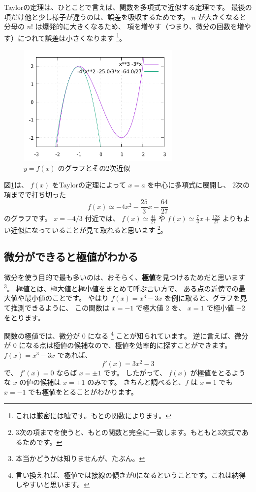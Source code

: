 \documentclass[uplatex,dvipdfmx]{jsarticle}
\begin{document}
  Taylorの定理は、ひとことで言えば、関数を多項式で近似する定理です。
  最後の項だけ他と少し様子が違うのは、誤差を吸収するためです。
  $n$ が大きくなると分母の $n!$ は爆発的に大きくなるため、
  項を増やす（つまり、微分の回数を増やす）につれて誤差は小さくなります
  \footnote{これは厳密には嘘です。もとの関数によります。}。

  \begin{figure}
    \centering
    \includegraphics[width=8cm]{diff2.png}
    \caption{$y = f(x)$ のグラフとその2次近似}
    \label{diff2}
  \end{figure}

  図\ref{diff2}は、 $f(x)$ をTaylorの定理によって $x=a$ を中心に多項式に展開し、
  2次の項までで打ち切った
  \[
    f(x) \simeq -4x^2 -\frac{25}{3}x -\frac{64}{27}
  \]
  のグラフです。
  $x = -4/3$ 付近では、
  $f(x) \simeq \frac{44}{27}$ や
  $f(x) \simeq \frac{7}{3}x + \frac{128}{27}$ よりもよい近似になっていることが見て取れると思います
  \footnote{3次の項までを使うと、もとの関数と完全に一致します。もともと3次式であるためです。}。

\subsection{微分ができると極値がわかる}
  微分を使う目的で最も多いのは、おそらく、\textbf{極値}を見つけるためだと思います
  \footnote{本当かどうかは知りませんが、たぶん。}。
  極値とは、極大値と極小値をまとめて呼ぶ言い方で、
  ある点の近傍での最大値や最小値のことです。
  やはり $f(x) = x^3 -3x$ を例に取ると、グラフを見て推測できるように、
  この関数は $x = -1$ で極大値 $2$ を、 $x = 1$ で極小値 $-2$ をとります。

  関数の極値では、微分が $0$ になる
  \footnote{言い換えれば、極値では接線の傾きが0になるということです。これは納得しやすいと思います。}
  ことが知られています。
  逆に言えば、微分が $0$ になる点は極値の候補なので、極値を効率的に探すことができます。
  $f(x) = x^3 -3x$ であれば、
  \[
    f'(x) = 3x^2 - 3
  \]
  で、 $f'(x) = 0$ ならば $x = \pm 1$ です。
  したがって、 $f(x)$ が極値をとるような $x$ の値の候補は $x = \pm 1$ のみです。
  きちんと調べると、$f$ は $x = 1$ でも $x = -1$ でも極値をとることがわかります。
\end{document}
